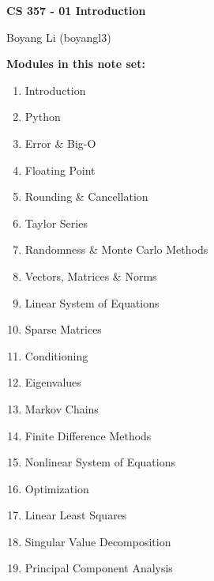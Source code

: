\documentclass[12pt]{article}
\begin{document}
\begin{center}\Large\bf 
CS 357 - 01 Introduction\\
\end{center}
\begin{center}
Boyang Li (boyangl3)
\end{center}

\medskip
\noindent \textbf{Modules in this note set: }
\begin{enumerate}
    \item   Introduction		
    \item	Python		
    \item	Error \& Big-O		
    \item	Floating Point		
    \item	Rounding \& Cancellation		
    \item	Taylor Series		
    \item	Randomness \& Monte Carlo Methods		
    \item	Vectors, Matrices \& Norms		
    \item	Linear System of Equations		
    \item	Sparse Matrices		
    \item	Conditioning		
    \item	Eigenvalues		
    \item	Markov Chains		
    \item	Finite Difference Methods
    \item	Nonlinear System of Equations
    \item	Optimization
    \item	Linear Least Squares		
    \item	Singular Value Decomposition		
    \item	Principal Component Analysis	
\end{enumerate}
	
\end{document}
